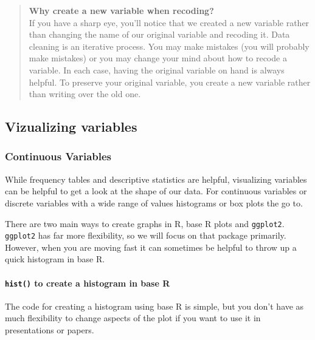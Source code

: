 \documentclass[
]{book}
\begin{document}
\begin{quote}
\textbf{Why create a new variable when recoding?}\\
If you have a sharp eye, you'll notice that we created a new variable rather than changing the name of our original variable and recoding it. Data cleaning is an iterative process. You may make mistakes (you will probably make mistakes) or you may change your mind about how to recode a variable. In each case, having the original variable on hand is always helpful. To preserve your original variable, you create a new variable rather than writing over the old one.
\end{quote}

\hypertarget{vizualizing-variables-1}{%
\subsection*{Vizualizing variables}\label{vizualizing-variables-1}}

\hypertarget{continuous-variables-1}{%
\subsubsection*{Continuous Variables}\label{continuous-variables-1}}

While frequency tables and descriptive statistics are helpful, visualizing variables can be helpful to get a look at the shape of our data. For continuous variables or discrete variables with a wide range of values histograms or box plots the go to.

There are two main ways to create graphs in R, base R plots and \texttt{ggplot2}. \texttt{ggplot2} has far more flexibility, so we will focus on that package primarily. However, when you are moving fast it can sometimes be helpful to throw up a quick histogram in base R.

\hypertarget{hist}{%
\paragraph*{\texorpdfstring{\texttt{hist()} to create a histogram in base R}{hist() to create a histogram in base R}}\label{hist}}

The code for creating a histogram using base R is simple, but you don't have as much flexibility to change aspects of the plot if you want to use it in presentations or papers.
\end{document}
